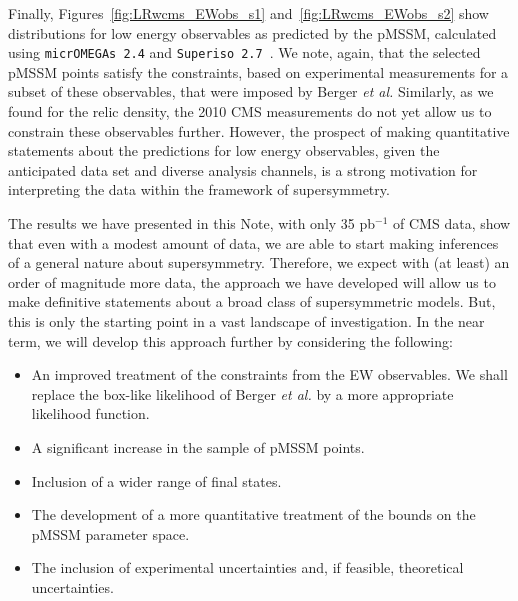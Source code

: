 Finally, Figures~\ref{fig:LRwcms_EWobs_s1} and~\ref{fig:LRwcms_EWobs_s2} show distributions for low energy observables as predicted by the pMSSM, calculated using {\tt micrOMEGAs 2.4} and {\tt Superiso 2.7}~\cite{Mahmoudi:2008tp}.  We note, again, that the selected pMSSM points satisfy the constraints, based on experimental measurements for a subset of these observables, that were imposed by Berger {\it et al.} Similarly, as we found for the relic density, the 2010 CMS measurements do not yet allow us to constrain these observables further.  However, the prospect of making quantitative statements about the predictions for low energy observables, given the anticipated data set and diverse analysis channels, is a strong motivation for interpreting the data within the framework of supersymmetry.

The results we have presented in this Note, with only 35 pb$^{-1}$ of CMS data, show that even with a modest amount of data, we are able to start making inferences of a general nature
about supersymmetry. 
Therefore, we expect with (at least) an order of magnitude more data, the approach we have developed will allow us to make definitive statements about a broad class of supersymmetric models.  But, this is only the starting point in a vast landscape of investigation. In the near term, 
we will develop this approach further by considering the following:

\begin{itemize}
\item An improved treatment of the constraints from the EW observables.  We shall replace the box-like likelihood of Berger {\it et al.} by a more appropriate likelihood function.
\item A significant increase in the sample of pMSSM points. 
\item Inclusion of a wider range of final states.
\item The development of a more quantitative treatment of the bounds on the pMSSM parameter space.
\item The inclusion of experimental uncertainties and, if feasible, theoretical uncertainties.
\end{itemize}





